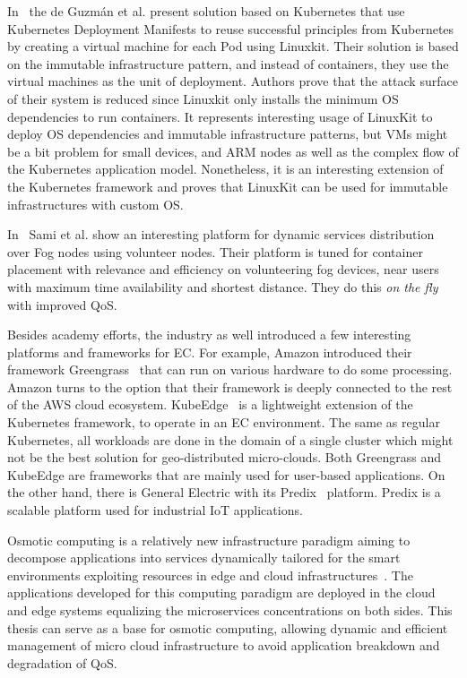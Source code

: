 In~\cite{abs-1802-10375} the de Guzm{\'{a}}n et al. present solution based on Kubernetes that use Kubernetes Deployment Manifests to reuse successful principles from Kubernetes by creating a virtual machine for each Pod using Linuxkit. Their solution is based on the immutable infrastructure pattern, and instead of containers, they use the virtual machines as the unit of deployment. Authors prove that the attack surface of their system is reduced since Linuxkit only installs the minimum OS dependencies to run containers. It represents interesting usage of LinuxKit to deploy OS dependencies and immutable infrastructure patterns, but VMs might be a bit problem for small devices, and ARM nodes as well as the complex flow of the Kubernetes application model. Nonetheless, it is an interesting extension of the Kubernetes framework and proves that LinuxKit can be used for immutable infrastructures with custom OS.

In~\cite{SamiM20} Sami et al. show an interesting platform for dynamic services distribution over Fog nodes using volunteer nodes. Their platform is tuned for container placement with relevance and efficiency on volunteering fog devices, near users with maximum time availability and shortest distance. They do this \textit{on the fly}  with improved QoS.

Besides academy efforts, the industry as well introduced a few interesting platforms and frameworks for EC. For example, Amazon introduced their framework Greengrass~\cite{kurniawan_2018} that can run on various hardware to do some processing. Amazon turns to the option that their framework is deeply connected to the rest of the AWS cloud ecosystem.  KubeEdge~\cite{KubeEdge} is a lightweight extension of the Kubernetes framework, to operate in an EC environment. The same as regular Kubernetes, all workloads are done in the domain of a single cluster which might not be the best solution for geo-distributed micro-clouds. Both Greengrass and KubeEdge are frameworks that are mainly used for user-based applications. On the other hand, there is General Electric with its Predix~\cite{GE_Predix} platform. Predix is a scalable platform used for industrial IoT applications.

Osmotic computing is a relatively new infrastructure paradigm aiming to decompose applications into services dynamically tailored for the smart environments exploiting resources in edge and cloud infrastructures~\cite{VillariFDRJR19}. The applications developed for this computing paradigm are deployed in the cloud and edge systems equalizing the microservices concentrations on both sides. This thesis can serve as a base for osmotic computing, allowing dynamic and efficient management of micro cloud infrastructure to avoid application breakdown and degradation of QoS.
%
%
